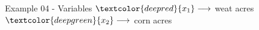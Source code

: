 \begin{frame}{Example 04 - Variables}
\Huge{
$\textcolor{deepred}  {{x}_{1}} \longrightarrow$
    weat acres \\ \vspace{1cm}
$\textcolor{deepgreen}{{x}_{2}} \longrightarrow$
    corn acres
}
\end{frame}
